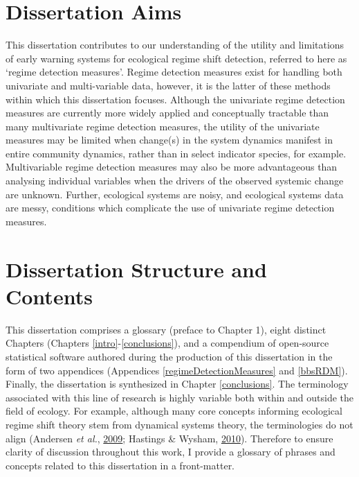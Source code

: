 \documentclass[print]{nuthesis}
\begin{document}
\hypertarget{dissertation-aims}{%
\section{Dissertation Aims}\label{dissertation-aims}}

This dissertation contributes to our understanding of the utility and limitations of early warning systems for ecological regime shift detection, referred to here as `regime detection measures'. Regime detection measures exist for handling both univariate and multi-variable data, however, it is the latter of these methods within which this dissertation focuses. Although the univariate regime detection measures are currently more widely applied and conceptually tractable than many multivariate regime detection measures, the utility of the univariate measures may be limited when change(s) in the system dynamics manifest in entire community dynamics, rather than in select indicator species, for example. Multivariable regime detection measures may also be more advantageous than analysing individual variables when the drivers of the observed systemic change are unknown. Further, ecological systems are noisy, and ecological systems data are messy, conditions which complicate the use of univariate regime detection measures.

\hypertarget{dissertation-structure-and-contents}{%
\section{Dissertation Structure and Contents}\label{dissertation-structure-and-contents}}

This dissertation comprises a glossary (preface to Chapter 1), eight distinct Chapters (Chapters \ref{intro}-\ref{conclusions}), and a compendium of open-source statistical software authored during the production of this dissertation in the form of two appendices (Appendices \ref{regimeDetectionMeasures} and \ref{bbsRDM}). Finally, the dissertation is synthesized in Chapter \ref{conclusions}. The terminology associated with this line of research is highly variable both within and outside the field of ecology. For example, although many core concepts informing ecological regime shift theory stem from dynamical systems theory, the terminologies do not align (Andersen \emph{et al.}, \protect\hyperlink{ref-andersen_ecological_2009}{2009}; Hastings \& Wysham, \protect\hyperlink{ref-hastings2010regime}{2010}). Therefore to ensure clarity of discussion throughout this work, I provide a glossary of phrases and concepts related to this dissertation in a front-matter.
\end{document}
